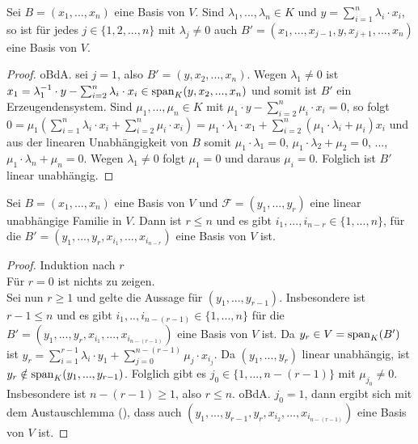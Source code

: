 \begin{lemma}[Austauschlemma]
	Sei $B=(x_1,...,x_n)$  eine Basis von $V$. Sind $\lambda_1,...,\lambda_n \in K$ und 
	$y=\sum_{i=1}^n \lambda_i\cdot x_i$, so ist für jedes $j\in \{1,2,...,n\}$ mit $\lambda_j\neq 0$ auch 
	$B'=(x_1,...,x_{j-1},y,x_{j+1},...,x_n)$ eine Basis von $V$.
\end{lemma}
\begin{proof}
	oBdA. sei $j=1$, also $B'=(y,x_2,...,x_n)$. Wegen $\lambda_1\neq 0$ ist $x_1=\lambda_1^{-1}\cdot y - \sum
	_{i=2}^n \lambda_i\cdot x_i \in \operatorname{span}_K(y,x_2,...,x_n)$ und somit ist $B'$ ein Erzeugendensystem. Sind 
	$\mu_1,...,\mu_n \in K$ mit $\mu_1\cdot y - \sum_{i=2}^n \mu_i\cdot x_i=0$, so folgt $0=\mu_1(\sum
	_{i=1}^n \lambda_i\cdot x_i + \sum_{i=2}^n \mu_i\cdot x_i)=\mu_1\cdot \lambda_1\cdot x_1 + \sum
	_{i=2}^n (\mu_1\cdot \lambda_i + \mu_i)x_i$ und aus der linearen Unabhängigkeit von $B$ somit $\mu_1\cdot 
	\lambda_1=0$, $\mu_1\cdot \lambda_2 + \mu_2 =0$, ..., $\mu_1\cdot\lambda_n + \mu_n=0$. Wegen $\lambda_1\neq 0$ folgt 
	$\mu_1=0$ und daraus $\mu_i=0$. Folglich ist $B'$ linear unabhängig.
\end{proof}

\begin{theorem}
	Sei $B=(x_1,...,x_n)$ eine Basis von $V$ und $\mathcal F=(y_1,...
	,y_r)$ eine linear unabhängige Familie in $V$. Dann ist $r\le n$ und es gibt $i_1,...,i_{n-r} \in \{1,...,n\}$, für 
	die $B'=(y_1,...,y_r,x_{i_1},...,x_{i_{n-r}})$ eine Basis von $V$ ist. 
\end{theorem}
\begin{proof}
	Induktion nach $r$\\
	Für $r=0$ ist nichts zu zeigen. \\
	Sei nun $r\ge 1$ und gelte die Aussage für $(y_1,...,y_{r-1})$. Insbesondere ist $r-1\le n$ und es gibt $i_1,..,
	i_{n-(r-1)} \in \{1,...,n\}$ für die $B'=(y_1,...,y_r,x_{i_1},...,x_{i_{n-(r-1)}})$ eine Basis von $V$ ist. Da $y_r
	\in V=\operatorname{span}_K(B')$ ist $y_r=\sum_{i=1}^{r-1} \lambda_i\cdot y_1 + \sum_{j=0}^{n-(r-1)} \mu_j\cdot 
	x_{i_j}$. Da $(y_1,...,y_r)$ linear unabhängig, ist $y_r \notin \operatorname{span}_K(y_1,...,y_{r-1})$. Folglich gibt es $j_0 \in 
	\{1,...,n-(r-1)\}$ mit $\mu_{j_0}\neq 0$. Insbesondere ist $n-(r-1)\ge 1$, also $r\le n$. oBdA. $j_0=1$, dann 
	ergibt sich mit dem Austauschlemma (), dass auch $(y_1,...,y_{r-1},y_r,x_{i_2},...,x_{i_{n-(r-1)}})$ eine Basis von 
	$V$ ist.
\end{proof}

